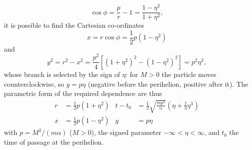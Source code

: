 \begin{problem}[title={Time dependence on a parabolic Kepler orbit}]
{\begin{equation*}
    \cos{\phi} = \frac{p}{r} - 1 = \frac{1-\eta^2}{1+\eta^2},
\end{equation*}
it is possible to find the Cartesian co-ordinates
\begin{equation*}
    x = r\cos{\phi} = \frac{1}{2}p\left(1-\eta^2\right)
\end{equation*}
and
\begin{equation*}
    y^2 = r^2 - x^2 = \frac{p^2}{4}\left[\left(1+\eta^2\right)^2-\left(1-\eta^2\right)^2\right] = p^2\eta^2 ,
\end{equation*}
whose branch is selected by the sign of $\eta$: for $M>0$ the particle moves counterclockwise, so $y = p\eta$ (negative before the perihelion, positive after it). The parametric form of the required dependence are thus
}
{
\begin{align*}
    r &= \frac{1}{2}p\left(1+\eta^2\right) & t - t_0 &= \frac{1}{2}\sqrt{\frac{mp^3}{\alpha}}\left(\eta+\frac{1}{3}\eta^3\right) \\
    x &= \frac{1}{2}p\left(1-\eta^2\right) & y &= p\eta
\end{align*}
with $p = M^2/(m\alpha)$ ($M>0$), the signed parameter $-\infty<\eta<\infty$, and $t_0$ the time of passage at the perihelion.
}
\end{problem}


